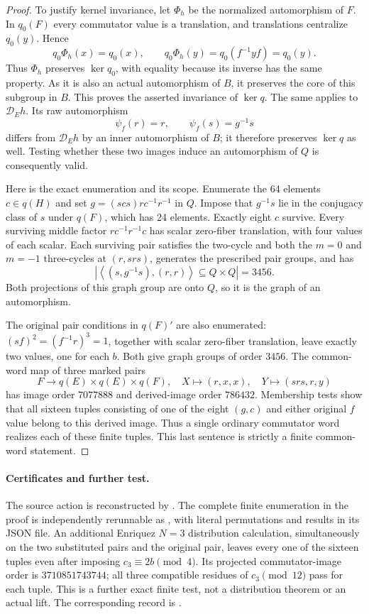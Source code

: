\begin{proof}
To justify kernel invariance, let $\Phi_h$ be the normalized
automorphism of $F$. In $q_0(F)$ every commutator value is a
translation, and translations centralize $q_0(y)$. Hence
\[
 q_0\Phi_h(x)=q_0(x),\qquad
 q_0\Phi_h(y)=q_0(f^{-1}yf)=q_0(y).
\]
Thus $\Phi_h$ preserves $\ker q_0$, with equality because
its inverse has the same property. As it is also an actual
automorphism of $B$, it preserves the core of this subgroup in
$B$. This proves the asserted invariance of $\ker q$.
The same applies to $\mathcal D_E h$. Its raw automorphism
\[
 \psi_f(r)=r,\qquad\psi_f(s)=g^{-1}s
\]
differs from $\mathcal D_E h$ by an inner automorphism of $B$;
it therefore preserves $\ker q$ as well. Testing whether these
two images induce an automorphism of $Q$ is consequently valid.

Here is the exact enumeration and its scope. Enumerate the 64
elements $c\in q(H)$ and set
$g=(scs)rc^{-1}r^{-1}$ in $Q$. Impose that $g^{-1}s$ lie in
the conjugacy class of $s$ under $q(F)$, which has 24 elements.
Exactly eight $c$ survive. Every surviving middle factor
$rc^{-1}r^{-1}c$ has scalar zero-fiber translation, with four
values of each scalar. Each surviving pair satisfies the
two-cycle and both the $m=0$ and $m=-1$ three-cycles at
$(r,srs)$, generates the prescribed pair groups, and has
\[
 \left|\left\langle(s,g^{-1}s),(r,r)\right\rangle
               \subseteq Q\times Q\right|=3456.
\]
Both projections of this graph group are onto $Q$, so it is
the graph of an automorphism.

The original pair conditions in $q(F)'$ are also enumerated:
$(sf)^2=(f^{-1}r)^3=1$, together with scalar zero-fiber
translation, leave exactly two values, one for each $b$.
Both give graph groups of order $3456$. The common-word map
of three marked pairs
\[
 F\longrightarrow q(E)\times q(E)\times q(F),
 \quad X\longmapsto(r,x,x),\quad
 Y\longmapsto(srs,r,y)
\]
has image order $7077888$ and derived-image order $786432$.
Membership tests show that all sixteen tuples consisting of
one of the eight $(g,c)$ and either original $f$ value belong
to this derived image. Thus a single ordinary commutator word
realizes each of these finite tuples. This last sentence is
strictly a finite common-word statement.
\end{proof}

\paragraph{Certificates and further test.}
The source action is reconstructed by
. The complete finite
enumeration in the proof is independently rerunnable as
, with literal
permutations and results in its JSON file. An additional
Enriquez $N=3$ distribution calculation, simultaneously on
the two substituted pairs and the original pair, leaves every
one of the sixteen tuples even after imposing
$c_3\equiv2b\pmod4$. Its projected commutator-image order is
$3710851743744$; all three compatible residues of $c_3\pmod{12}$
pass for each tuple. This is a further exact finite test, not
a distribution theorem or an actual lift. The corresponding
record is
.

